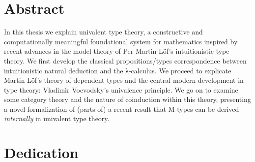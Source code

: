 \documentclass[12pt,twoside]{reedthesis}
\begin{document}

\tableofcontents

\chapter*{Abstract}

In this thesis we explain univalent type theory, a constructive and
computationally meaningful foundational system for mathematics inspired by
recent advances in the model theory of Per Martin-L\"of's intuitionistic type
theory. We first develop the classical propositions/types correspondence between
intuitionistic natural deduction and the λ-calculus. We proceed to explicate
Martin-L\"of's theory of dependent types and the central modern development in
type theory: Vladimir Voevodsky's univalence principle. We go on to examine some
category theory and the nature of coinduction within this theory, presenting a
novel formalization of (parts of) a recent result that M-types can be derived
\textit{internally} in univalent type theory.

\chapter*{Dedication}

\mainmatter %
\pagestyle{fancyplain} %
\end{document}
